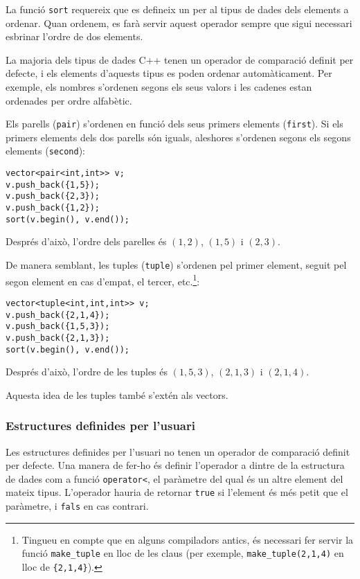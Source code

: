 
La funció \texttt{sort} requereix
que es defineix un  per al tipus de dades
dels elements a ordenar.
Quan ordenem, es farà servir aquest operador
sempre que sigui necessari esbrinar l'ordre de dos elements.

La majoria dels tipus de dades C++ tenen un operador de comparació definit
per defecte, i els elements d'aquests tipus es poden ordenar automàticament.
Per exemple, els nombres s'ordenen segons els seus valors i
les cadenes estan ordenades per ordre alfabètic.


Els parells (\texttt{pair}) s'ordenen en funció dels seus
primers elements (\texttt{first}).
Si els primers elements dels dos parells són iguals,
aleshores s'ordenen segons els segons elements (\texttt{second}):
\begin{lstlisting}
vector<pair<int,int>> v;
v.push_back({1,5});
v.push_back({2,3});
v.push_back({1,2});
sort(v.begin(), v.end());
\end{lstlisting}
Després d'això, l'ordre dels parelles és
$(1,2)$, $(1,5)$ i $(2,3)$.


De manera semblant, les tuples (\texttt{tuple})
s'ordenen pel primer element,
seguit pel segon element en cas d'empat, el tercer, etc.\footnote{
Tingueu en compte que en alguns compiladors antics,
és necessari fer servir la funció \texttt{make\_tuple} en lloc de les
claus (per exemple, \texttt{make\_tuple(2,1,4)} en lloc de \texttt{\{2,1,4\}}).}:
\begin{lstlisting}
vector<tuple<int,int,int>> v;
v.push_back({2,1,4});
v.push_back({1,5,3});
v.push_back({2,1,3});
sort(v.begin(), v.end());
\end{lstlisting}
Després d'això, l'ordre de les tuples és
$(1,5,3)$, $(2,1,3)$ i $(2,1,4)$.

Aquesta idea de les tuples també s'extén als vectors.

\subsubsection{Estructures definides per l'usuari}

Les estructures definides per l'usuari no tenen un
operador de comparació
definit per defecte.
Una manera de fer-ho és definir l'operador
a dintre de la estructura de dades com a funció
\texttt{operator<},
el paràmetre del qual és un altre element del mateix tipus.
L'operador hauria de retornar \texttt{true}
si l'element és més petit que el paràmetre,
i \texttt{fals} en cas contrari.

